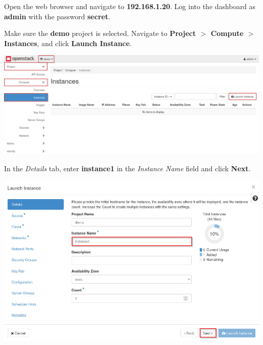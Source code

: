 \documentclass[letterpaper, 12pt]{article}
\begin{document}
\begin{enumerate}
    \begin{labstep}
        Open the web browser and navigate to \textbf{192.168.1.20}.
        Log into the dashboard as \textbf{admin} with the password \textbf{secret}.
    \end{labstep}

    \begin{labstep}
        Make sure the \textbf{demo} project is selected.
        Navigate to \textbf{Project $>$ Compute $>$ Instances}, and click \textbf{Launch Instance}.

        \begin{center}
            \includegraphics[width=\linewidth]{images/part2/step2.png}
        \end{center}
    \end{labstep}

    \begin{labstep}
        In the \textit{Details} tab, enter \textbf{instance1} in the \textit{Instance Name} field and click \textbf{Next}.

        \begin{center}
            \includegraphics[width=\linewidth]{images/part2/step3.png}
        \end{center}
    \end{labstep}


\end{enumerate}
\end{document}
